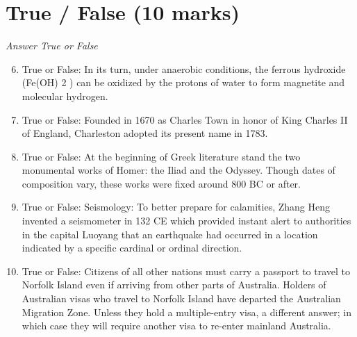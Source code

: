 \documentclass[12pt]{article}
\begin{document}
\section*{True / False (10 marks)}
\textit{Answer True or False}
\begin{enumerate}[label=\arabic*.]
\setcounter{enumi}{5}
\item True or False: In its turn, under anaerobic conditions, the ferrous hydroxide (Fe(OH) 2 ) can be oxidized by the protons of water to form magnetite and molecular hydrogen.
\item True or False: Founded in 1670 as Charles Town in honor of King Charles II of England, Charleston adopted its present name in 1783.
\item True or False: At the beginning of Greek literature stand the two monumental works of Homer: the Iliad and the Odyssey. Though dates of composition vary, these works were fixed around 800 BC or after.
\item True or False: Seismology: To better prepare for calamities, Zhang Heng invented a seismometer in 132 CE which provided instant alert to authorities in the capital Luoyang that an earthquake had occurred in a location indicated by a specific cardinal or ordinal direction.
\item True or False: Citizens of all other nations must carry a passport to travel to Norfolk Island even if arriving from other parts of Australia. Holders of Australian visas who travel to Norfolk Island have departed the Australian Migration Zone. Unless they hold a multiple-entry visa, a different answer; in which case they will require another visa to re-enter mainland Australia.
\end{enumerate}
\end{document}
